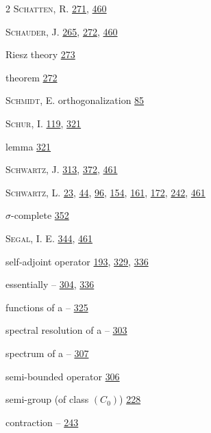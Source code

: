 \begin{multicols}{2}
\noindent \textsc{Schatten}, R. \hyperlink{page.271}{271}, \hyperlink{page.460}{460}\par
\noindent \textsc{Schauder}, J. \hyperlink{page.265}{265}, \hyperlink{page.272}{272}, \hyperlink{page.460}{460}\par
\hspace*{1.1em}Riesz theory \hyperlink{page.273}{273}\par
\hspace*{1.1em}theorem \hyperlink{page.272}{272}\par
\noindent \textsc{Schmidt}, E. orthogonalization \hyperlink{page.85}{85}\par
\noindent \textsc{Schur}, I. \hyperlink{page.119}{119}, \hyperlink{page.321}{321}\par
\hspace*{1.1em}lemma \hyperlink{page.321}{321}\par
\noindent \textsc{Schwartz}, J. \hyperlink{page.313}{313}, \hyperlink{page.372}{372}, \hyperlink{page.461}{461}\par
\noindent \textsc{Schwartz}, L. \hyperlink{page.23}{23}, \hyperlink{page.44}{44}, \hyperlink{page.96}{96}, \hyperlink{page.154}{154}, \hyperlink{page.161}{161}, \hyperlink{page.172}{172}, \hyperlink{page.242}{242}, \hyperlink{page.461}{461}\par
\noindent $\sigma $-complete \hyperlink{page.352}{352}\par
\noindent \textsc{Segal}, I. E. \hyperlink{page.344}{344}, \hyperlink{page.461}{461}\par
\noindent self-adjoint operator \hyperlink{page.193}{193}, \hyperlink{page.329}{329}, \hyperlink{page.336}{336}\par
\hspace*{1.1em}essentially -- \hyperlink{page.304}{304}, \hyperlink{page.336}{336}\par
\hspace*{1.1em}functions of a -- \hyperlink{page.325}{325}\par
\hspace*{1.1em}spectral resolution of a -- \hyperlink{page.303}{303}\par
\hspace*{1.1em}spectrum of a -- \hyperlink{page.307}{307}\par
\noindent semi-bounded operator \hyperlink{page.306}{306}\par
\noindent semi-group (of class $ (C_{0}) $) \hyperlink{page.228}{228}\par
\hspace*{1.1em}contraction -- \hyperlink{page.243}{243}\par

\end{multicols}
